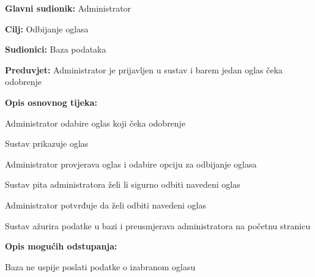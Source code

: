 					\noindent {}
					\begin{packed_item}
	
						\item \textbf{Glavni sudionik: }Administrator
						\item  \textbf{Cilj:} Odbijanje oglasa
						\item  \textbf{Sudionici:} Baza podataka
						\item  \textbf{Preduvjet:} Administrator je prijavljen u sustav i barem jedan oglas čeka odobrenje
						\item  \textbf{Opis osnovnog tijeka:}
						
						\item[] \begin{packed_enum}
							\item Administrator odabire oglas koji čeka odobrenje
							\item Sustav prikazuje oglas
							\item Administrator provjerava oglas i odabire opciju za odbijanje oglasa
							\item Sustav pita administratora želi li sigurno odbiti navedeni oglas
							\item Administrator potvrđuje da želi odbiti navedeni oglas
							\item Sustav ažurira podatke u bazi i preusmjerava administratora na početnu stranicu
						\end{packed_enum}

						\eject

						\item  \textbf{Opis mogućih odstupanja:}

						\item[] \begin{packed_item}
							\item[2.a] Baza ne uspije poslati podatke o izabranom oglasu
							\item[] \begin{packed_enum}
								

\end{packed_enum}
\end{packed_item}
\end{packed_item}
